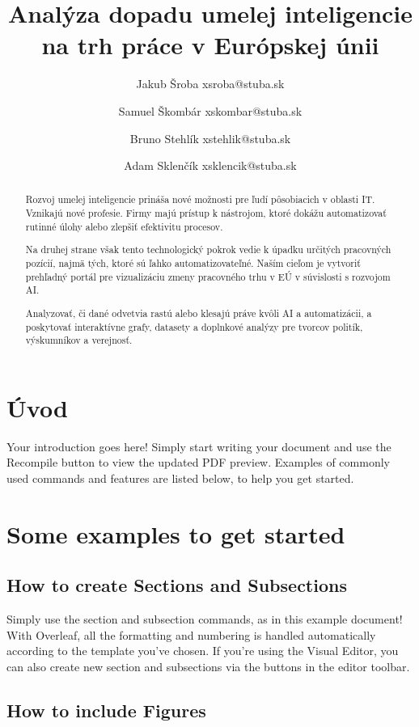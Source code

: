 \documentclass{article}
\title{Analýza dopadu umelej inteligencie na trh práce v Európskej únii}
\author{
Jakub Šroba xsroba@stuba.sk \\
\and
Samuel Škombár xskombar@stuba.sk \\ 
\and
Bruno Stehlík xstehlik@stuba.sk \\ 
\and
Adam Sklenčík xsklencik@stuba.sk \\ 
}
\begin{document}
\maketitle

\begin{abstract}
Rozvoj umelej inteligencie prináša nové možnosti pre ľudí pôsobiacich v oblasti IT. Vznikajú nové profesie. Firmy majú prístup k nástrojom, ktoré dokážu automatizovať rutinné úlohy alebo zlepšiť efektivitu procesov.

Na druhej strane však tento technologický pokrok vedie k úpadku určitých pracovných pozícií, najmä tých, ktoré sú ľahko automatizovateľné. Naším cieľom je vytvoriť prehľadný portál pre vizualizáciu zmeny pracovného trhu v EÚ v súvislosti s rozvojom AI.

Analyzovať, či dané odvetvia rastú alebo klesajú práve kvôli AI a automatizácii, a poskytovať interaktívne grafy, datasety a doplnkové analýzy pre tvorcov politík, výskumníkov a verejnosť.

\end{abstract}

\section{Úvod}

Your introduction goes here! Simply start writing your document and use the Recompile button to view the updated PDF preview. Examples of commonly used commands and features are listed below, to help you get started.

\section{Some examples to get started}

\subsection{How to create Sections and Subsections}

Simply use the section and subsection commands, as in this example document! With Overleaf, all the formatting and numbering is handled automatically according to the template you've chosen. If you're using the Visual Editor, you can also create new section and subsections via the buttons in the editor toolbar.

\subsection{How to include Figures}
\end{document}
